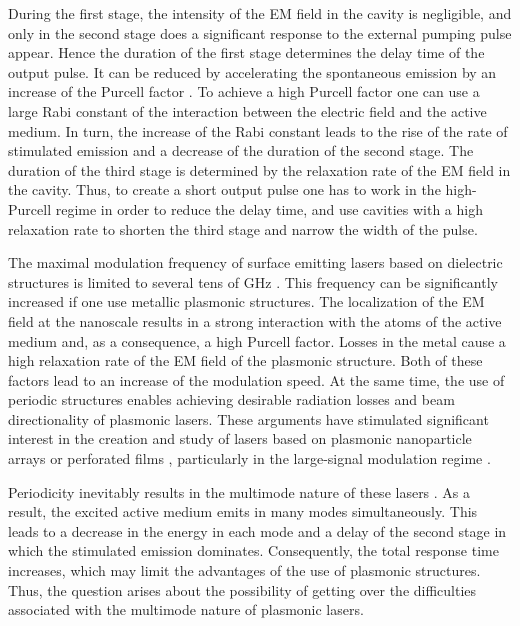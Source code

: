 \documentclass[aps,pra,amsmath,amssymb,onecolumn,superscriptaddress,showpacs,floatfix,]{revtex4-1}
\begin{document}
During the first stage, the intensity of the EM field in the cavity is negligible, and only in the second stage does a significant response to the external pumping pulse appear.
Hence the duration of the first stage determines the delay time of the output pulse.
It can be reduced by accelerating the spontaneous emission by an increase of the Purcell factor \cite{altug2006ultrafast, altug2008lpr}.
To achieve a high Purcell factor one can use a large Rabi constant of the interaction between the electric field and the active medium.
In turn, the increase of the Rabi constant leads to the rise of the rate of stimulated emission and a decrease of the duration of the second stage.
The duration of the third stage is determined by the relaxation rate of the EM field in the cavity.
Thus, to create a short output pulse one has to work in the high-Purcell regime in order to reduce the delay time, and use cavities with a high relaxation rate to shorten the third stage and narrow the width of the pulse.

The maximal modulation frequency of surface emitting lasers based on dielectric structures is limited to several tens of GHz \cite{coldren2012diode, scott1994high}.
This frequency can be significantly increased if one use metallic plasmonic structures.
The localization of the EM field at the nanoscale results in a strong interaction with the atoms of the active medium and, as a consequence, a high Purcell factor.
Losses in the metal cause a high relaxation rate of the EM field of the plasmonic structure.
Both of these factors lead to an increase of the modulation speed.
At the same time, the use of periodic structures enables achieving desirable radiation losses and beam directionality of plasmonic lasers.
These arguments have stimulated significant interest in the creation and study of lasers based on plasmonic nanoparticle arrays or perforated films \cite{BeijnumPRL,SchokkerPRB,ZhouNatNano,MengLPR}, particularly in the large-signal modulation regime \cite{daskalakis2018nanolett}.

Periodicity inevitably results in the multimode nature of these lasers \cite{BeijnumPRL,TennerJOpt}.
As a result, the excited active medium emits in many modes simultaneously.
This leads to a decrease in the energy in each mode and a delay of the second stage in which the stimulated emission dominates.
Consequently, the total response time increases, which may limit the advantages of the use of plasmonic structures.
Thus, the question arises about the possibility of getting over the difficulties associated with the multimode nature of plasmonic lasers.
\end{document}
